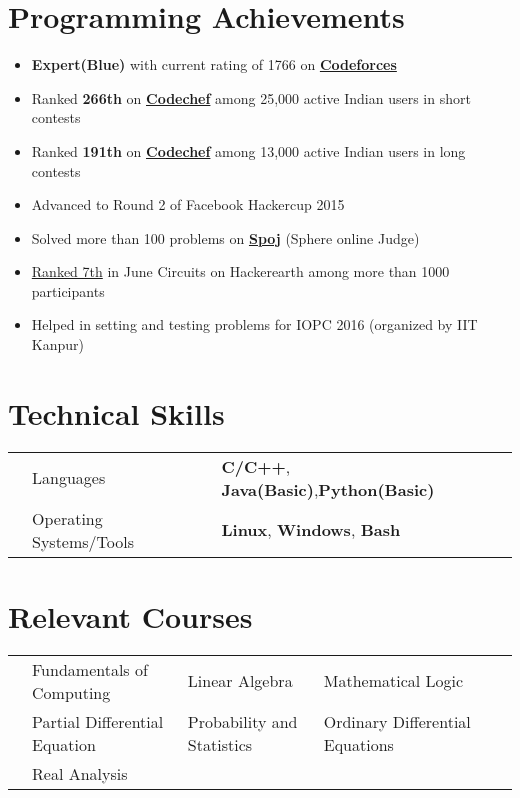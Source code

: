 \documentclass[11pt,a4paper]{article}
\begin{document}
\section*{Programming Achievements}
\begin{itemize}
\item \textbf{Expert(Blue)} with current rating of 1766 on  \href{http://codeforces.com/profile/Swastik1996} {\textbf{Codeforces}}
\item Ranked \textbf{266th} on \href{http://codechef.com/users/Swastik1996} {\textbf{Codechef}} among 25,000 active Indian users in short contests
\item Ranked \textbf{191th} on \href{http://codechef.com/users/Swastik1996} {\textbf{Codechef}} among 13,000 active Indian users in long contests
\item Advanced to Round 2 of Facebook Hackercup 2015
\item Solved more than 100 problems on \href{http://www.spoj.com/users/swastik1996/} {\textbf{Spoj}} (Sphere online Judge)
\item \href{https://www.hackerearth.com/june-circuits/leaderboard/} {Ranked 7th} in June Circuits on Hackerearth among more than 1000 participants 
\item Helped in setting and testing problems for IOPC 2016 (organized by IIT Kanpur)
\end{itemize}

\section*{Technical Skills}
\vspace{-0.2cm}
\begin{tabular}{L{0.05cm} L{5cm} l}
&Languages     &\textbf{C/C++}, \textbf{Java(Basic)},\textbf{Python(Basic)}\\
&Operating Systems/Tools     &\textbf{Linux}, \textbf{Windows}, \textbf{Bash}\\
\end{tabular}
\vspace{-0.4cm}

\section*{Relevant Courses}
\vspace{-0.3cm}
\begin{tabular}{L{0.05cm} L{5.8cm} L{6.5cm} L{7.5cm} L{8cm} L{13cm}}
& Fundamentals of Computing  & Linear Algebra & Mathematical Logic \vspace{0.1cm}\\

& Partial Differential Equation & Probability and Statistics & Ordinary Differential Equations \vspace{0.1cm}\\
& Real Analysis

\end{tabular}
\end{document}
